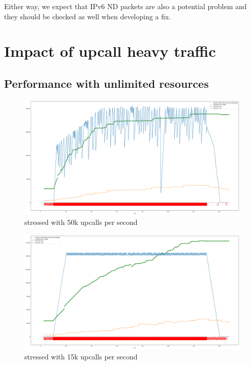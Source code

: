 Either way, we expect that IPv6 ND packets are also a potential problem and they should be checked as well when developing a fix.

\section{Impact of upcall heavy traffic}
\label{res:upcall-stress}

\subsection{Performance with unlimited resources}
\label{subsec:standard-behavior}

\begin{figure}
    \centering
    \includegraphics[width=.9\linewidth]{img/packet_flood_bare_50k.png}
    \caption{ stressed with 50k upcalls per second}
    \label{fig:plot-packet-flood-bare-50k}
\end{figure}

\begin{figure}
    \centering
    \includegraphics[width=.9\linewidth]{img/packet_flood_bare_15k.png}
    \caption{ stressed with 15k upcalls per second}
    \label{fig:plot-packet-flood-bare-15k}
\end{figure}

